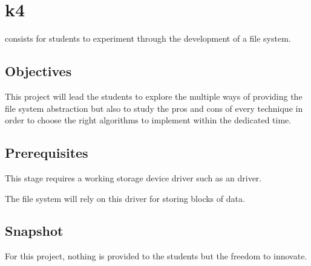 %
%
%
%
%
%

%
%

\chapter{k4}
\label{chapter:k4}

 consists for students to experiment through the development of
a file system.

\newpage

%
%

%
%

\section{Objectives}

This project will lead the students to explore the multiple ways of providing
the file system abstraction but also to study the pros and cons of every
technique in order to choose the right algorithms to implement within the
dedicated time.

%
%

\section{Prerequisites}

This stage requires a working storage device driver such as an  driver.

The file system will rely on this driver for storing blocks of data.

%
%

\section{Snapshot}

For this project, nothing is provided to the students but the freedom to
innovate.

%
%

